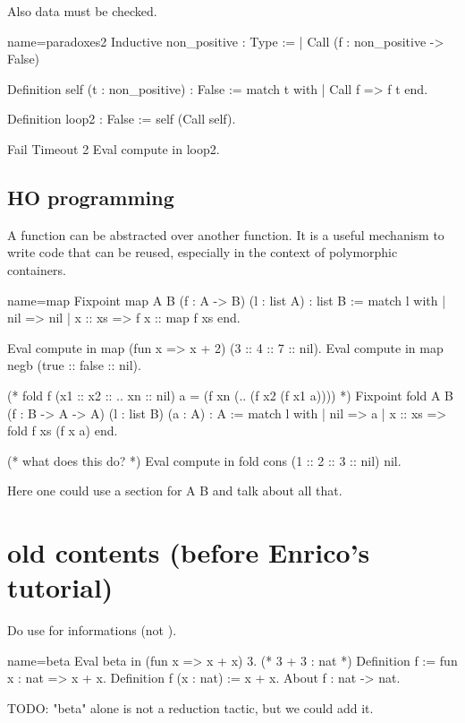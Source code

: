 Also data must be checked.

\begin{coq}{name=paradoxes2}{}
Inductive non_positive : Type :=
| Call (f : non_positive -> False)

Definition self (t : non_positive) : False :=
  match t with
  | Call f => f t
  end.

Definition loop2 : False := self (Call self).

Fail Timeout 2 Eval compute in loop2.
\end{coq}

\subsection{HO programming}

A function can be abstracted over another
   function.  It is a useful mechanism to write
   code that can be reused, especially in the context
   of polymorphic containers.

\begin{coq}{name=map}{}
Fixpoint map A B (f : A -> B) (l : list A) : list B :=
  match l with
  | nil => nil
  | x :: xs => f x :: map f xs
  end.

Eval compute in
  map (fun x => x + 2) (3 :: 4 :: 7 :: nil).
Eval compute in
  map negb (true :: false :: nil).

(* fold f (x1 :: x2 :: .. xn :: nil) a
     =
            (f xn (.. (f x2 (f x1 a))))
*)
Fixpoint fold A B (f : B -> A -> A) (l : list B) (a : A) : A :=
  match l with
  | nil => a
  | x :: xs => fold f xs (f x a)
  end.

(* what does this do? *)
Eval compute in fold cons (1 :: 2 :: 3 :: nil) nil.
\end{coq}

Here one could use a section for A B and talk about all that.

\section{old contents (before Enrico's tutorial)}

Do use  for informations (not ).
\begin{coq}{name=beta}{}
Eval beta in (fun x => x + x) 3. (* 3 + 3 : nat *)
Definition f := fun x : nat => x + x.
Definition f (x : nat) := x + x.
About f : nat -> nat.
\end{coq}

TODO: "beta" alone is not a reduction tactic, but we could add it.

